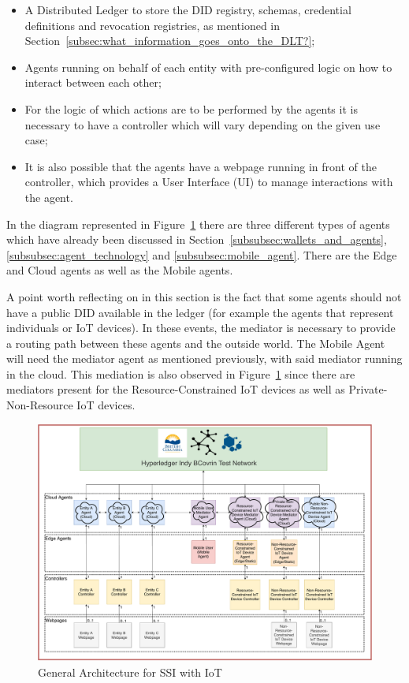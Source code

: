 \begin{itemize}
    \item A Distributed Ledger to store the DID registry, schemas, credential definitions and revocation registries, as mentioned in Section~\ref{subsec:what_information_goes_onto_the_DLT?};
    \item Agents running on behalf of each entity with pre-configured logic on how to interact between each other;
    \item For the logic of which actions are to be performed by the agents it is necessary to have a controller which will vary depending on the given use case;
    \item It is also possible that the agents have a webpage running in front of the controller, which provides a User Interface (UI) to manage interactions with the agent.
\end{itemize}

In the diagram represented in Figure~\ref{fig:general_architecture_ssi_with_iot} there are three different types of agents which have already been discussed in Section~\ref{subsubsec:wallets_and_agents}, \ref{subsubsec:agent_technology} and \ref{subsubsec:mobile_agent}. There are the Edge and Cloud agents as well as the Mobile agents. 

A point worth reflecting on in this section is the fact that some agents should not have a public DID available in the ledger (for example the agents that represent individuals or IoT devices). In these events, the mediator is necessary to provide a routing path between these agents and the outside world. 
The Mobile Agent will need the mediator agent as mentioned previously, with said mediator running in the cloud. 
This mediation is also observed in Figure~\ref{fig:general_architecture_ssi_with_iot} since there are mediators present for the Resource-Constrained IoT devices as well as Private-Non-Resource IoT devices.



\begin{figure}[!htb]
    \centering
    \includegraphics[width=0.85\linewidth]{images/SSIWithIoTArchitecture.pdf}
    \caption{General Architecture for SSI with IoT}
    \label{fig:general_architecture_ssi_with_iot}
\end{figure}

